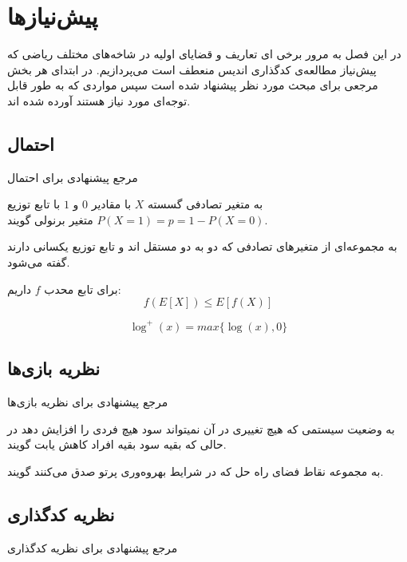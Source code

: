 \chapter{پیش‌نیازها}
\label{chapter:preliminaries}
در این فصل به مرور برخی ای تعاریف و قضایای اولیه در شاخه‌های مختلف ریاضی که پیش‌نیاز مطالعه‌ی کدگذاری اندیس منعطف است می‌پردازیم. در ابتدای هر بخش مرجعی برای مبحث مورد نظر پیشنهاد شده است سپس مواردی که به طور قابل توجه‌ای مورد نیاز هستند آورده شده اند.

\section{احتمال}
مرجع پیشنهادی برای احتمال
\cite{book:pro}

\begin{definition}
	به متغیر تصادفی گسسته
	$X$
	با مقادیر
	$0$
	و
	$1$
	با تابع توزیع
	$P(X = 1) = p = 1 - P(X = 0)$
	متغیر برنولی گویند.
\end{definition}
\begin{definition}
به مجموعه‌ای از متغیرهای تصادفی که دو به دو مستقل اند و تابع توزیع یکسانی دارند گفته می‌شود.
\end{definition}
\begin{theorem}
	\label{Jensen}
	برای تابع محدب
	$f$
	داریم:
	$$f(E[X]) \leq E[f(X)]$$
\end{theorem}

$$\log^{+}(x) = max\{\log(x), 0\}$$
\section{نظریه بازی‌ها}
مرجع پیشنهادی برای نظریه بازی‌ها
\cite{book:game}

\begin{definition}
	\label{def:Pareto}
	به وضعیت سیستمی که هیچ تغییری در آن نمیتواند سود هیچ فردی را افزایش دهد
	در حالی که بقیه سود بقیه افراد کاهش یابت گویند.
	\cite{wiki:pareto}
	
	\label{def:Pareto-boundary}
	به مجموعه نقاط فضای راه حل که در شرایط بهروه‌وری پرتو صدق می‌کنند گویند.
\end{definition}

\section{نظریه کدگذاری}
مرجع پیشنهادی برای نظریه کدگذاری
\cite{book:coding}

